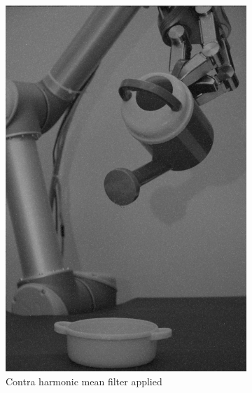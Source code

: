 \begin{figure}[H]
\begin{subfigure}[b]{0.24\textwidth}
        \includegraphics[width=\textwidth]{img1/img_1_gaus_5_1.png}
        \caption{Contra harmonic mean filter applied}
    \end{subfigure}  
       \begin{subfigure}[b]{0.24\textwidth}

\end{subfigure}
\end{figure}
